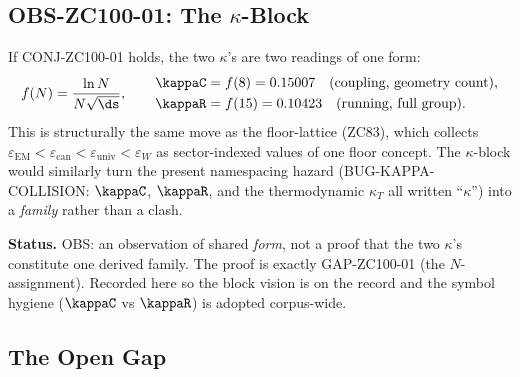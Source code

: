 \documentclass[12pt, a4paper]{article}
\begin{document}
\subsection{OBS-ZC100-01: The $\kappa$-Block}
\label{sec:block-zc100}

\begin{openqbox}[title={OBS-ZC100-01: One Form, Sector-Indexed --- the
  $\kappa$-Block (modeled on the $\varepsilon$ floor-lattice, ZC83)}]
If CONJ-ZC100-01 holds, the two $\kappa$'s are two readings of one form:
\[
  f(N)=\frac{\ln N}{N\sqrt{\ds}},
  \qquad
  \begin{aligned}
    \kappaC&=f(8)=0.15007\quad\text{(coupling, geometry count)},\\
    \kappaR&=f(15)=0.10423\quad\text{(running, full group)} .
  \end{aligned}
\]
This is structurally the same move as the floor-lattice (ZC83), which collects
$\varepsilon_{\mathrm{EM}}<\varepsilon_{\mathrm{can}}<\varepsilon_{\mathrm{univ}}
<\varepsilon_W$ as sector-indexed values of one floor concept. The $\kappa$-block
would similarly turn the present namespacing hazard
(BUG-KAPPA-COLLISION: $\kappaC$, $\kappaR$, and the thermodynamic $\kappa_T$ all
written ``$\kappa$'') into a \emph{family} rather than a clash.

\textbf{Status.} OBS: an observation of shared \emph{form}, not a proof that the
two $\kappa$'s constitute one derived family. The proof is exactly
GAP-ZC100-01 (the $N$-assignment). Recorded here so the block vision is on the
record and the symbol hygiene ($\kappaC$ vs $\kappaR$) is adopted corpus-wide.
\end{openqbox}

\subsection{The Open Gap}
\label{sec:gap-zc100}
\end{document}
